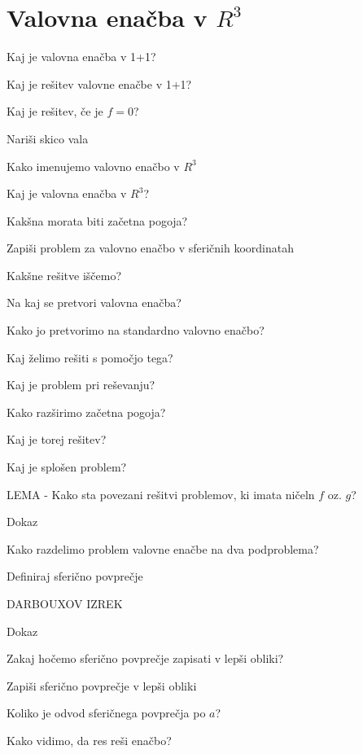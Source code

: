 \documentclass{article}
\begin{document}
    \section{Valovna enačba v $R^3$}
    \begin{enumerate}
        \item Kaj je valovna enačba v 1+1?
        \item Kaj je rešitev valovne enačbe v 1+1?
        \item Kaj je rešitev, če je $f = 0$?
        \item Nariši skico vala 
        \item 
        {\color{red}\item Kako imenujemo valovno enačbo v $R^3$} 
        \item Kaj je valovna enačba v $R^3$?
        \item Kakšna morata biti začetna pogoja?
        \item Zapiši problem za valovno enačbo v sferičnih koordinatah
        \item Kakšne rešitve iščemo?
        \item Na kaj se pretvori valovna enačba?
        {\color{red}\item Kako jo pretvorimo na standardno valovno enačbo?}
        \item Kaj želimo rešiti s pomočjo tega?
        \item Kaj je problem pri reševanju?
        \item Kako razširimo začetna pogoja?
        {\color{red}\item Kaj je torej rešitev?}
        \item Kaj je splošen problem?
        {\color{red}\item LEMA - Kako sta povezani rešitvi problemov, ki imata ničeln $f$ oz. $g$?}
        {\color{red}\item Dokaz}
        \item Kako razdelimo problem valovne enačbe na dva podproblema?
        {\color{red}\item Definiraj sferično povprečje}
        {\color{red}\item DARBOUXOV IZREK}
        Dokaz
        \item Zakaj hočemo sferično povprečje zapisati v lepši obliki?
        {\color{red}\item Zapiši sferično povprečje v lepši obliki}
        \item Koliko je odvod sferičnega povprečja po $a$?
        \item Kako vidimo, da res reši enačbo?

\end{enumerate}
\end{document}
